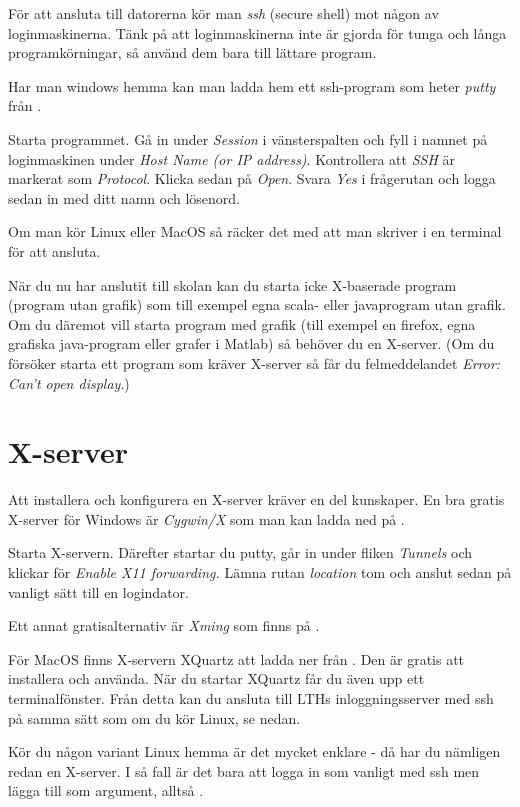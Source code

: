 \documentclass[a4paper,twocolumn]{book}
\begin{document}
För att ansluta till datorerna kör man \emph{ssh} (secure shell) mot någon av
loginmaskinerna. Tänk på att loginmaskinerna inte är gjorda för tunga
och långa programkörningar, så använd dem bara till lättare program.

Har man windows hemma kan man ladda hem ett ssh-program som heter
\emph{putty} från .

Starta
programmet. Gå in under \emph{Session} i vänsterspalten och fyll i
namnet på loginmaskinen
under \emph{Host Name (or IP address)}.
Kontrollera att \emph{SSH} är markerat som
\emph{Protocol}. Klicka
sedan på \emph{Open}. Svara \emph{Yes} i frågerutan och logga sedan in med
ditt namn och lösenord.

Om man kör Linux eller MacOS så räcker det med att man skriver
 i en terminal för att ansluta.

När du nu har anslutit till skolan kan du starta icke X-baserade program
(program utan grafik) som till exempel egna scala- eller javaprogram
utan grafik.
Om du däremot vill starta program med grafik (till exempel en firefox, egna
grafiska java-program eller grafer i Matlab) så behöver du en X-server.
(Om du försöker starta ett program som kräver X-server så får du
felmeddelandet \emph{Error: Can't open display}.)


\section{X-server}

Att installera och konfigurera en X-server kräver en del kunskaper. En bra
gratis X-server för Windows är \emph{Cygwin/X} som man kan ladda ned på
.

Starta X-servern. Därefter startar du putty, går in under fliken
\emph{Tunnels} och klickar för \emph{Enable X11 forwarding.} Lämna rutan
\emph{location} tom och anslut sedan på vanligt sätt till en logindator.

Ett annat gratisalternativ är \emph{Xming} som finns på
.

För MacOS finns X-servern XQuartz att ladda ner från . Den är gratis att installera och använda. När du startar XQuartz får du även upp ett terminalfönster. Från detta kan du ansluta till LTHs inloggningsserver med ssh på samma sätt som om du kör Linux, se nedan.

Kör du någon variant Linux hemma är det mycket enklare - då har du nämligen redan
en X-server. I så fall är det bara att logga in som vanligt med ssh men lägga
till  som argument, alltså .
\end{document}
